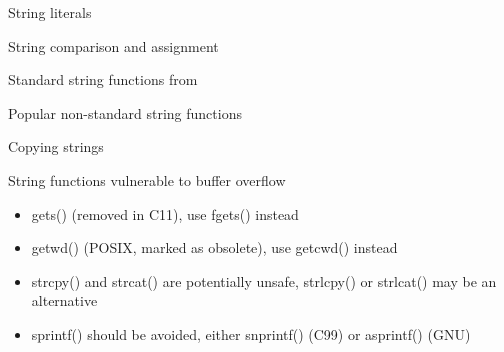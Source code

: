 \begin{frame}{String literals}
\end{frame}
\begin{frame}{String comparison and assignment}
    
\end{frame}
\begin{frame}{Standard string functions from }
    
\end{frame}
\begin{frame}{Popular non-standard string functions}
    
\end{frame}
\begin{frame}{Copying strings}
    \only<1>{ Bad:  }
    \only<2>{ Bad:  }
\end{frame}
\begin{frame}{String functions vulnerable to buffer overflow}
    \begin{itemize}
        \item gets() (removed in C11), use fgets() instead
        \item getwd() (POSIX, marked as obsolete), use getcwd() instead
        \item strcpy() and strcat() are potentially unsafe, strlcpy() or strlcat() may be an alternative
        \item sprintf() should be avoided, either snprintf() (C99) or asprintf() (GNU)
    \end{itemize}
\end{frame}


